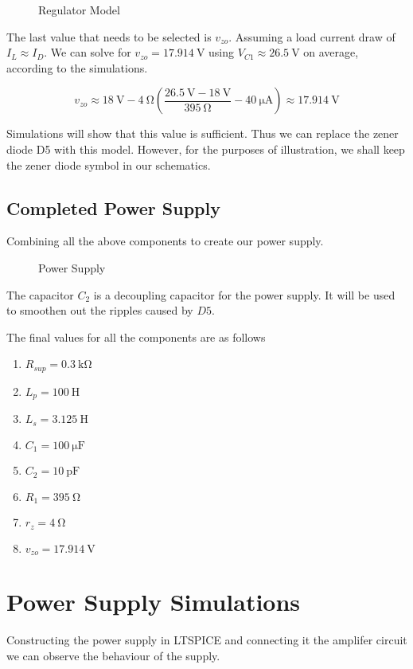 \documentclass[journal]{IEEEtran}
\begin{document}
\begin{figure}[H]
	\centering
	
	\caption{Regulator Model\cite{roberts_2017_diodes}}
	\label{zenermodel}
\end{figure}

The last value that needs to be selected is $v_{zo}$. Assuming a load current draw of $I_L \approx I_D$. We can solve for $v_{zo} = \SI{17.914}{\volt}$ using $V_{C1} \approx \SI{26.5}{\volt}$ on average, according to the simulations.

$$ v_{zo} \approx \SI{18}{\volt} - \SI{4}{\ohm}\left( \frac{ \SI{26.5}{\volt} - \SI{18}{\volt} } {\SI{395}{\ohm}} - \SI{40}{\micro\ampere} \right) \approx \SI{17.914}{\volt} $$

Simulations will show that this value is sufficient. Thus we can replace the zener diode D5 with this model. However, for the purposes of illustration, we shall keep the zener diode symbol in our schematics.

\subsection{Completed Power Supply}

Combining all the above components to create our power supply.

\begin{figure}[H]
	\centering
	
	\caption{Power Supply \cite{roberts_2017_diodes}}
	\label{ps}
\end{figure}

The capacitor $C_2$ is a decoupling capacitor for the power supply. It will be used to smoothen out the ripples caused by $D5$.

The final values for all the components are as follows
\begin{enumerate}
	\item $R_{sup} = \SI{0.3}{\kilo\ohm}$
	\item $L_p = \SI{100}{\henry}$
	\item $L_s = \SI{3.125}{\henry}$
	\item $C_1 = \SI{100}{\micro\farad}$
	\item $C_2 = \SI{10}{\pico\farad}$
	\item $R_1 = \SI{395}{\ohm}$
	\item $r_z = \SI{4}{\ohm}$
	\item $v_{zo} = \SI{17.914}{\volt}$
\end{enumerate}

\section{Power Supply Simulations}
Constructing the power supply in LTSPICE and connecting it the amplifer circuit we can observe the behaviour of the supply.
\end{document}
